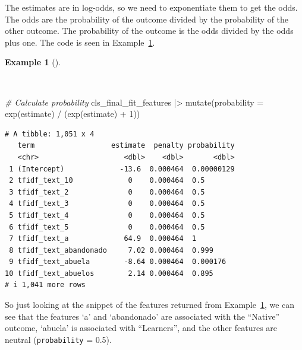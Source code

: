 \documentclass[
  letterpaper,
]{latex/krantz}
\newenvironment{Shaded}{\begin{snugshade}}{\end{snugshade}}
\newcommand{\AttributeTok}[1]{\textcolor[rgb]{0.00,0.00,0.00}{#1}}
\newcommand{\CommentTok}[1]{\textcolor[rgb]{0.00,0.00,0.00}{\textit{#1}}}
\newcommand{\DecValTok}[1]{\textcolor[rgb]{0.00,0.00,0.00}{#1}}
\newcommand{\FunctionTok}[1]{\textcolor[rgb]{0.00,0.00,0.00}{#1}}
\newcommand{\NormalTok}[1]{\textcolor[rgb]{0.00,0.00,0.00}{#1}}
\newcommand{\SpecialCharTok}[1]{\textcolor[rgb]{0.00,0.00,0.00}{#1}}
\theoremstyle{definition}
\newtheorem{example}{Example}[chapter]
\theoremstyle{remark}
\begin{document}
The estimates are in log-odds, so we need to exponentiate them to get
the odds. The odds are the probability of the outcome divided by the
probability of the other outcome. The probability of the outcome is the
odds divided by the odds plus one. The code is seen in
Example~\ref{exm-predict-class-tune-hyperparameters-evaluate-test-estimates-probability}.

\begin{example}[]\protect\hypertarget{exm-predict-class-tune-hyperparameters-evaluate-test-estimates-probability}{}\label{exm-predict-class-tune-hyperparameters-evaluate-test-estimates-probability}

~

\begin{Shaded}
\begin{Highlighting}[]
\CommentTok{\# Calculate probability}
\NormalTok{cls\_final\_fit\_features }\SpecialCharTok{|\textgreater{}}
  \FunctionTok{mutate}\NormalTok{(}\AttributeTok{probability =} \FunctionTok{exp}\NormalTok{(estimate) }\SpecialCharTok{/}\NormalTok{ (}\FunctionTok{exp}\NormalTok{(estimate) }\SpecialCharTok{+} \DecValTok{1}\NormalTok{))}
\end{Highlighting}
\end{Shaded}

\begin{verbatim}
# A tibble: 1,051 x 4
   term                  estimate  penalty probability
   <chr>                    <dbl>    <dbl>       <dbl>
 1 (Intercept)             -13.6  0.000464  0.00000129
 2 tfidf_text_10             0    0.000464  0.5       
 3 tfidf_text_2              0    0.000464  0.5       
 4 tfidf_text_3              0    0.000464  0.5       
 5 tfidf_text_4              0    0.000464  0.5       
 6 tfidf_text_5              0    0.000464  0.5       
 7 tfidf_text_a             64.9  0.000464  1         
 8 tfidf_text_abandonado     7.02 0.000464  0.999     
 9 tfidf_text_abuela        -8.64 0.000464  0.000176  
10 tfidf_text_abuelos        2.14 0.000464  0.895     
# i 1,041 more rows
\end{verbatim}

\end{example}

So just looking at the snippet of the features returned from
Example~\ref{exm-predict-class-tune-hyperparameters-evaluate-test-estimates-probability},
we can see that the features `a' and `abandonado' are associated with
the ``Native'' outcome, `abuela' is associated with ``Learners'', and
the other features are neutral (\texttt{probability} = 0.5).
\end{document}
